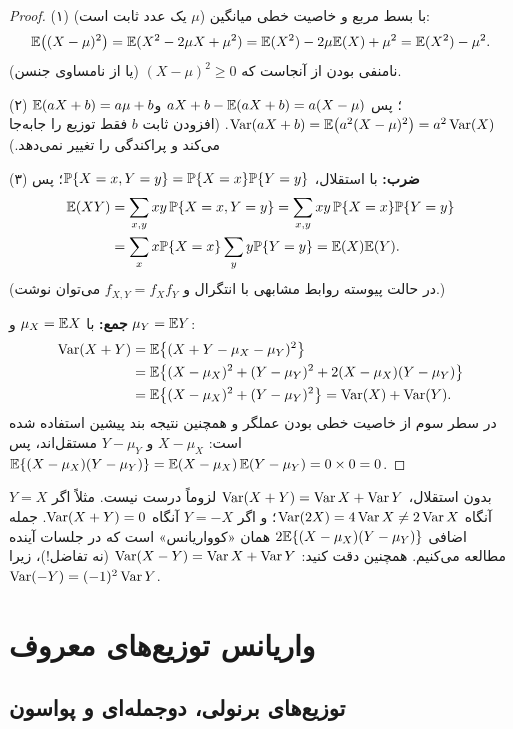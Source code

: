 \begin{proof}
(۱) با بسط مربع و خاصیت خطی میانگین ($\mu$ یک عدد ثابت است):
\[
\mathbb{E}\big((X-\mu)^2\big)=\mathbb{E}(X^2-2\mu X+\mu^2)=\mathbb{E}(X^2)-2\mu\mathbb{E}(X)+\mu^2=\mathbb{E}(X^2)-\mu^2 .
\]
نامنفی بودن از آنجاست که $(X-\mu)^2\ge0$ (یا از نامساوی جنسن).

(۲) $\mathbb{E}(aX+b)=a\mu+b$؛ پس $aX+b-\mathbb{E}(aX+b)=a(X-\mu)$ و
$\operatorname{Var}(aX+b)=\mathbb{E}\big(a^2(X-\mu)^2\big)=a^2\operatorname{Var}(X)$. (افزودن ثابت $b$ فقط توزیع را جابه‌جا می‌کند و پراکندگی را تغییر نمی‌دهد.)

(۳) \textbf{ضرب:} با استقلال، $\mathbb{P}\{X=x,Y=y\}=\mathbb{P}\{X=x\}\mathbb{P}\{Y=y\}$؛ پس
\[
\begin{aligned}
\mathbb{E}(XY)&=\sum_{x,y}xy\,\mathbb{P}\{X=x,Y=y\}=\sum_{x,y}xy\,\mathbb{P}\{X=x\}\mathbb{P}\{Y=y\}\\
&=\sum_xx\mathbb{P}\{X=x\}\sum_yy\mathbb{P}\{Y=y\}=\mathbb{E}(X)\mathbb{E}(Y).
\end{aligned}
\]
(در حالت پیوسته روابط مشابهی با انتگرال و $f_{X,Y}=f_Xf_Y$ می‌توان نوشت.)

\textbf{جمع:} با $\mu_X=\mathbb{E} X$ و $\mu_Y=\mathbb{E} Y$:
\[
\begin{aligned}
\operatorname{Var}(X+Y)&=\mathbb{E}\big\{(X+Y-\mu_X-\mu_Y)^2\big\}\\
&=\mathbb{E}\big\{(X-\mu_X)^2+(Y-\mu_Y)^2+2(X-\mu_X)(Y-\mu_Y)\big\}\\
&=\mathbb{E}\big\{(X-\mu_X)^2+(Y-\mu_Y)^2\big\}=\operatorname{Var}(X)+\operatorname{Var}(Y).
\end{aligned}
\]
در سطر سوم از خاصیت خطی بودن عملگر  و همچنین نتیجه بند پیشین استفاده شده است: $X-\mu_X$ و $Y-\mu_Y$ مستقل‌اند، پس
$\mathbb{E}\{(X-\mu_X)(Y-\mu_Y)\}=\mathbb{E}(X-\mu_X)\,\mathbb{E}(Y-\mu_Y)=0\times0=0$.
\end{proof}

\begin{warning}
\warntitle بدون استقلال، $\operatorname{Var}(X+Y)=\operatorname{Var} X+\operatorname{Var} Y$ لزوماً درست نیست. مثلاً اگر $Y=X$ آنگاه $\operatorname{Var}(2X)=4\operatorname{Var} X\neq2\operatorname{Var} X$؛ و اگر $Y=-X$ آنگاه $\operatorname{Var}(X+Y)=0$. جمله اضافی $2\mathbb{E}\{(X-\mu_X)(Y-\mu_Y)\}$ همان «کوواریانس» است که در جلسات آینده مطالعه می‌کنیم. همچنین دقت کنید: $\operatorname{Var}(X-Y)=\operatorname{Var} X+\operatorname{Var} Y$ (نه تفاضل!)، زیرا $\operatorname{Var}(-Y)=(-1)^2\operatorname{Var} Y$.
\end{warning}

\section{واریانس توزیع‌های معروف}

\subsection{توزیع‌های برنولی، دوجمله‌ای و پواسون}


